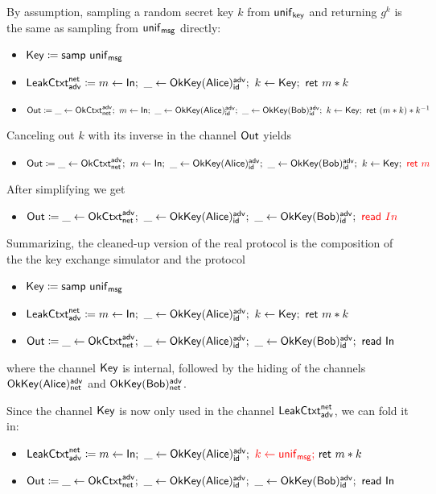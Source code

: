 \noindent By assumption, sampling a random secret key $k$ from $\unif_\key$ and returning $g^k$ is the same as sampling from $\unif_\msg$ directly:

\begin{itemize}
\item {\color{red} $\Key \coloneqq \samp{\unif_\msg}$}
\item $\LeakCtxt^\net_\adv \coloneqq m \leftarrow \In; \ \_ \leftarrow \OkKey(\Alice)^\adv_\id; \ k \leftarrow \Key; \ \ret{m * k}$
\item $\Out \coloneqq \_ \leftarrow \OkCtxt^\adv_\net; \ m \leftarrow \In; \ \_ \leftarrow \OkKey(\Alice)^\adv_\id; \ \_ \leftarrow \OkKey(\Bob)^\adv_\id; \ k \leftarrow \Key; \ \ret{(m * k) * k^{-1}}$
\end{itemize}

\noindent Canceling out $k$ with its inverse in the channel $\Out$ yields
\begin{itemize}
\item $\Out \coloneqq \_ \leftarrow \OkCtxt^\adv_\net; \ m \leftarrow \In; \ \_ \leftarrow \OkKey(\Alice)^\adv_\id; \ \_ \leftarrow \OkKey(\Bob)^\adv_\id; \ k \leftarrow \Key; \ {\color{red} \ret{m}}$
\end{itemize}
After simplifying we get
\begin{itemize}
\item $\Out \coloneqq \_ \leftarrow \OkCtxt^\adv_\net; \ \_ \leftarrow \OkKey(\Alice)^\adv_\id; \ \_ \leftarrow \OkKey(\Bob)^\adv_\id; \ {\color{red} \read{In}}$
\end{itemize}

\noindent Summarizing, the cleaned-up version of the real protocol is the composition of the the key exchange simulator and the protocol
\begin{itemize}
\item $\Key \coloneqq \samp{\unif_\msg}$
\item $\LeakCtxt^\net_\adv \coloneqq m \leftarrow \In; \ \_ \leftarrow \OkKey(\Alice)^\adv_\id; \ k \leftarrow \Key; \ \ret{m * k}$
\item $\Out \coloneqq \_ \leftarrow \OkCtxt^\adv_\net; \ \_ \leftarrow \OkKey(\Alice)^\adv_\id; \ \_ \leftarrow \OkKey(\Bob)^\adv_\id; \ \read{\In}$
\end{itemize}
where the channel $\Key$ is internal, followed by the hiding of the channels $\OkKey(\Alice)^\adv_\net$ and $\OkKey(\Bob)^\adv_\net$.

Since the channel $\Key$ is now only used in the channel $\LeakCtxt^\net_\adv$, we can fold it in:
\begin{itemize}
\item $\LeakCtxt^\net_\adv \coloneqq m \leftarrow \In; \ \_ \leftarrow \OkKey(\Alice)^\adv_\id; \ {\color{red} k \leftarrow \unif_\msg; \ } \ret{m * k}$
\item $\Out \coloneqq \_ \leftarrow \OkCtxt^\adv_\net; \ \_ \leftarrow \OkKey(\Alice)^\adv_\id; \ \_ \leftarrow \OkKey(\Bob)^\adv_\id; \ \read{\In}$
\end{itemize}

